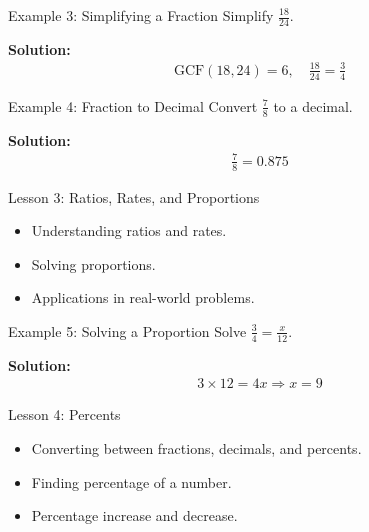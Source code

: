 \documentclass{beamer}
\begin{document}
\begin{frame}{Example 3: Simplifying a Fraction}
Simplify $\frac{18}{24}$.

\textbf{Solution:}
\begin{align*}
\text{GCF}(18,24) = 6, \quad \frac{18}{24} = \frac{3}{4}
\end{align*}
\end{frame}

\begin{frame}{Example 4: Fraction to Decimal}
Convert $\frac{7}{8}$ to a decimal.

\textbf{Solution:}
\begin{align*}
\frac{7}{8} = 0.875
\end{align*}
\end{frame}


\begin{frame}{Lesson 3: Ratios, Rates, and Proportions}
\begin{itemize}
    \item Understanding ratios and rates.
    \item Solving proportions.
    \item Applications in real-world problems.
\end{itemize}
\end{frame}

\begin{frame}{Example 5: Solving a Proportion}
Solve $\frac{3}{4} = \frac{x}{12}$.

\textbf{Solution:}
\begin{align*}
3 \times 12 = 4x \Rightarrow x = 9
\end{align*}
\end{frame}


\begin{frame}{Lesson 4: Percents}
\begin{itemize}
    \item Converting between fractions, decimals, and percents.
    \item Finding percentage of a number.
    \item Percentage increase and decrease.
\end{itemize}
\end{frame}
\end{document}
